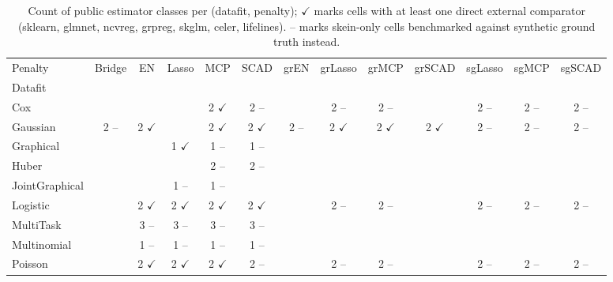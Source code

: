 \begin{table}[t]
  \centering
  \caption{Count of public estimator classes per (datafit, penalty); $\checkmark$ marks cells with at least one direct external comparator (sklearn, glmnet, ncvreg, grpreg, skglm, celer, lifelines). -- marks skein-only cells benchmarked against synthetic ground truth instead.}
  \label{tab:estimator_surface}
\begin{tabular}{lcccccccccccc}
\toprule
Penalty & Bridge & EN & Lasso & MCP & SCAD & grEN & grLasso & grMCP & grSCAD & sgLasso & sgMCP & sgSCAD \\
Datafit &  &  &  &  &  &  &  &  &  &  &  &  \\
\midrule
Cox &  &  &  & 2 $\checkmark$ & 2 -- &  & 2 -- & 2 -- &  & 2 -- & 2 -- & 2 -- \\
Gaussian & 2 -- & 2 $\checkmark$ &  & 2 $\checkmark$ & 2 $\checkmark$ & 2 -- & 2 $\checkmark$ & 2 $\checkmark$ & 2 $\checkmark$ & 2 -- & 2 -- & 2 -- \\
Graphical &  &  & 1 $\checkmark$ & 1 -- & 1 -- &  &  &  &  &  &  &  \\
Huber &  &  &  & 2 -- & 2 -- &  &  &  &  &  &  &  \\
JointGraphical &  &  & 1 -- & 1 -- &  &  &  &  &  &  &  &  \\
Logistic &  & 2 $\checkmark$ & 2 $\checkmark$ & 2 $\checkmark$ & 2 $\checkmark$ &  & 2 -- & 2 -- &  & 2 -- & 2 -- & 2 -- \\
MultiTask &  & 3 -- & 3 -- & 3 -- & 3 -- &  &  &  &  &  &  &  \\
Multinomial &  & 1 -- & 1 -- & 1 -- & 1 -- &  &  &  &  &  &  &  \\
Poisson &  & 2 $\checkmark$ & 2 $\checkmark$ & 2 $\checkmark$ & 2 -- &  & 2 -- & 2 -- &  & 2 -- & 2 -- & 2 -- \\
\bottomrule
\end{tabular}
\end{table}
